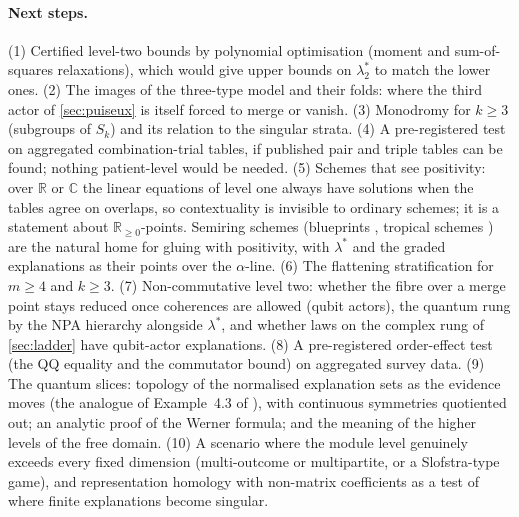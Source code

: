 \documentclass[11pt]{article}
\theoremstyle{definition}\newtheorem{definition}[theorem]{Definition}\newtheorem{remark}[theorem]{Remark}\newtheorem{example}[theorem]{Example}
\newcommand{\R}{\mathbb R}
\begin{document}
\paragraph{Next steps.}
(1) Certified level-two bounds by polynomial optimisation (moment and sum-of-squares relaxations), which would give upper bounds on
$\lambda^*_2$ to match the lower ones. (2) The images of the three-type model and their folds: where the third actor of
\cref{sec:puiseux} is itself forced to merge or vanish. (3) Monodromy for $k\ge3$ (subgroups of $S_k$) and its relation to the
singular strata. (4) A pre-registered test on aggregated combination-trial tables, if published pair and triple tables can be found;
nothing patient-level would be needed. (5) Schemes that see positivity: over $\R$ or $\mathbb C$ the linear equations of level one always
have solutions when the tables agree on overlaps, so contextuality is invisible to ordinary schemes; it is a statement about
$\R_{\ge0}$-points. Semiring schemes (blueprints \cite{Lorscheid2012}, tropical schemes \cite{GiansiracusaGiansiracusa2016}) are the
natural home for gluing with positivity, with $\lambda^*$ and the graded explanations as their points over the $\alpha$-line.
(6) The flattening stratification for $m\ge4$ and $k\ge3$. (7) Non-commutative level two: whether the fibre over a merge point stays reduced once coherences are allowed (qubit actors), the
quantum rung by the NPA hierarchy alongside $\lambda^*$, and whether laws on the complex rung of \cref{sec:ladder} have qubit-actor
explanations. (8) A pre-registered order-effect test (the QQ equality and the commutator bound) on aggregated survey data. (9) The quantum slices:
topology of the normalised explanation sets as the evidence moves (the analogue of Example~4.3 of \cite{IVW2026}), with continuous
symmetries quotiented out; an analytic proof of the Werner formula; and the meaning of the higher levels of the free domain. (10) A scenario where the module level genuinely exceeds every
fixed dimension (multi-outcome or multipartite, or a Slofstra-type game), and representation homology with non-matrix coefficients
\cite{Li2026} as a test of where finite explanations become singular.
\end{document}
